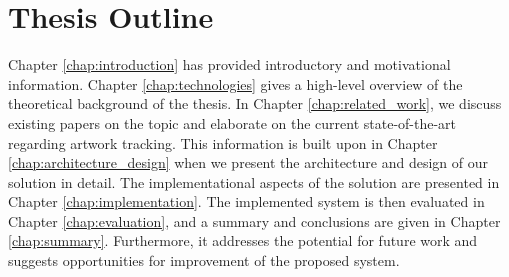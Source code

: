 \section{Thesis Outline}
Chapter \ref{chap:introduction} has provided introductory and motivational information. Chapter \ref{chap:technologies} gives a high-level overview of the theoretical background of the thesis. In Chapter \ref{chap:related_work}, we discuss existing papers on the topic and elaborate on the current state-of-the-art regarding artwork tracking. This information is built upon in Chapter \ref{chap:architecture_design} when we present the architecture and design of our solution in detail. The implementational aspects of the solution are presented in Chapter \ref{chap:implementation}. The implemented system is then evaluated in Chapter \ref{chap:evaluation}, and a summary and conclusions are given in Chapter \ref{chap:summary}. Furthermore, it addresses the potential for future work and suggests opportunities for improvement of the proposed system.
